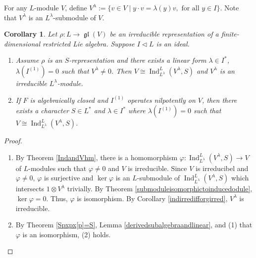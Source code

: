 \documentclass[12pt,MSc]{muthesis_2023}
\theoremstyle{plain}%
\newtheorem{Corollary}[FactCounter]{Corollary} %
\theoremstyle{definition}
\theoremstyle{remark}
\DeclareMathOperator{\gl}{\mathfrak{gl}}
\DeclareMathOperator{\Ind}{Ind}
\begin{document}
For any $L$-module $V$, define $V^{\lambda}:=\{v\in V \mid y\cdot v = \lambda(y)v, \text{ for all } y\in I\}$. Note that $V^{\lambda}$ is an $L^{\lambda}$-submodule of $V$.


\begin{Corollary}\label{VinducVlambisoandchar}
Let $\rho: L \rightarrow \gl(V)$ be an irreducible representation of a finite-dimensional restricted Lie algebra. Suppose $I \lhd L$ is an ideal.

\begin{enumerate}
\item[(1)]
Assume $\rho$ is an $S$-representation and there exists a linear form $\lambda \in I^*$, $\lambda(I^{(1)})=0$ such that $V^{\lambda}\neq 0$. Then $V \cong \Ind^L_{L^{\lambda}}(V^{\lambda}, S)$ and $V^{\lambda}$ is an irreducible $L^{\lambda}$-module.


\item[(2)] If $F$ is algebraically closed and $I^{(1)}$ operates nilpotently on $V$, then there exists a character $S\in L^*$ and $\lambda\in I^*$ where $\lambda(I^{(1)})=0$ such that $V\cong \Ind^L_{L^{\lambda}}(V^{\lambda}, S)$.

\end{enumerate}
\end{Corollary}

\begin{proof}
\begin{enumerate}
\item[(1)]
By Theorem \ref{IndandVhm}, there is a homomorphism $\varphi: \Ind^L_{L^{\lambda}}(V^{\lambda}, S) \rightarrow V$ of $L$-modules such that $\varphi\neq0$ and $V$ is irreducible. Since $V$ is irreducibel and $\varphi \neq 0$, $\varphi$ is surjective and $\ker \varphi$ is an $L$-submodule of $\Ind^L_{L^{\lambda}}(V^{\lambda}, S)$ which intersects $1\otimes V^{\lambda}$ trivially. By Theorem \ref{submoduleisomorphictoinducedodule}, $\ker\varphi=0$. Thus, $\varphi$ is isomorphism. By Corollary \ref{indirredifforgirred}, $V^{\lambda}$ is irreducible.

\item[(2)]
By Theorem \ref{Spxpx[p]=S}, Lemma \ref{derivedsubalgebraandlinear}, and (1) that $\varphi$ is an isomorphism, (2) holds.
\end{enumerate}
\end{proof}
\end{document}
